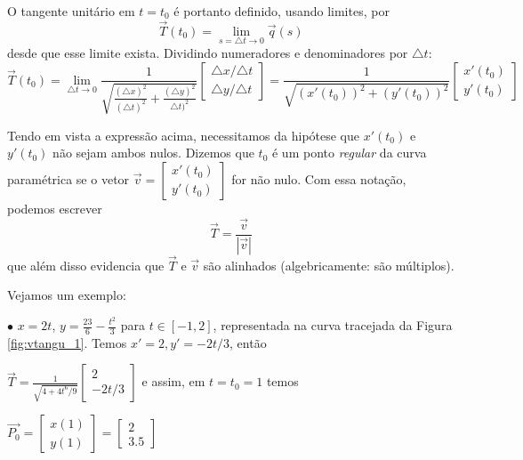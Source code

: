 O tangente unitário em $t=t_0$ é portanto definido, usando limites,  por 
\begin{equation}
\vec{T}(t_0) = \lim_{s=\triangle t \rightarrow 0} \vec{q}(s) 
\end{equation}
desde que esse limite exista. Dividindo numeradores e denominadores por $\triangle t$:
\begin{equation}
 \vec{T}(t_0)=\displaystyle \lim_{\triangle t \rightarrow 0} \frac{1}{\sqrt{ \frac{(\triangle x)^2}{(\triangle t)^2}  + \frac{(\triangle y)^2}{\triangle t)^2}}} \left[ \begin{array}{c} \triangle x / \triangle t \\ \triangle y / \triangle t \end{array} \right] = 
 \frac{1}{\sqrt{ (x'(t_0))^2  + (y'(t_0))^2 }} \left[ \begin{array}{c} x'(t_0) \\ y'(t_0) \end{array} \right] 
\end{equation}

\smallskip
Tendo em vista a expressão acima, necessitamos da hipótese que $x'(t_0)$ e $y'(t_0)$ não sejam ambos nulos. Dizemos que $t_0$ é um ponto {\it regular} da curva paramétrica se o vetor $\vec{v} = \left[ \begin{array}{c}
x'(t_0) \\ y'(t_0) \end{array} \right]$  for não nulo. Com essa notação, podemos escrever
\begin{equation}
\vec{T} = \frac{\vec{v}}{|\vec{v}|} 
\end{equation}
que além disso evidencia que $\vec{T}$ e $\vec{v}$ são alinhados (algebricamente: são múltiplos).

\smallskip

Vejamos um exemplo:


$\bullet$ $x= 2t$, $y= \frac{23}{6} - \frac{t^2}{3}$ para $ t \in [-1,2]$, representada na curva tracejada da Figura \ref{fig:vtangu_1}. Temos $x' = 2, y'=-2t/3$, então 

 $\displaystyle \vec{T} =  \frac{1}{\sqrt{ 4 + 4t^6/9 }} \left[ \begin{array}{c}
2 \\ -2t/3 \end{array} \right]$ e assim, em $t=t_0=1$ temos

$\vec{P_0} = \left[ \begin{array}{c} x(1) \\ y(1) \end{array} \right] = \left[ \begin{array}{c} 2 \\ 3.5 \end{array} \right]$

